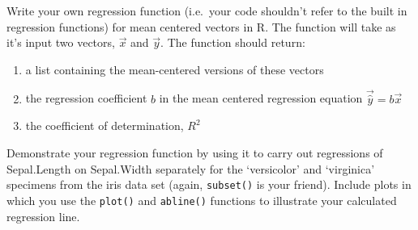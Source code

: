 \begin{assignment}
Write your own regression function (i.e.~your
code shouldn't refer to the built in regression functions) for mean
centered vectors in R. The function will take as it's input two vectors,
$\vec{x}$ and $\vec{y}$. The function should return:

\begin{enumerate}[1.]
\item
  a list containing the mean-centered versions of these vectors
\item
  the regression coefficient $b$ in the mean centered regression
  equation $\vec{\widehat{y}} = b\vec{x}$
\item
  the coefficient of determination, $R^2$
\end{enumerate}
Demonstrate your regression function by using it to carry out
regressions of Sepal.Length on Sepal.Width separately for the `versicolor'
and `virginica' specimens from the iris data set (again,
\lstinline!subset()! is your friend). Include plots in which you use the
\lstinline!plot()! and \lstinline!abline()! functions to illustrate your
calculated regression line.

\end{assignment}



